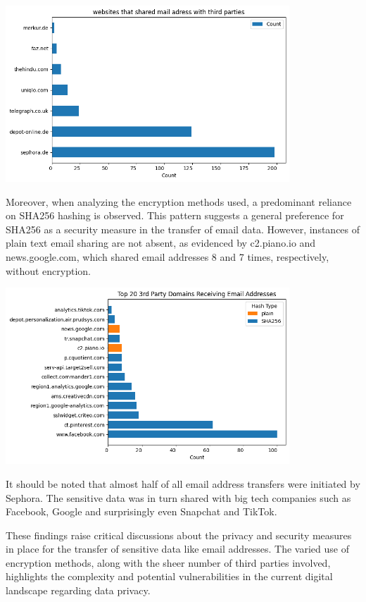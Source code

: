 \includegraphics[width=0.8\textwidth]{./assets/websitesSharingMailAddresses.png}

Moreover, when analyzing the encryption methods used, a predominant reliance on SHA256 hashing is observed. This pattern suggests a general preference for SHA256 as a security measure in the transfer of email data. However, instances of plain text email sharing are not absent, as evidenced by c2.piano.io and news.google.com, which shared email addresses 8 and 7 times, respectively, without encryption.

\includegraphics[width=0.8\textwidth]{./assets/top20thirdpartydomainsreceivingmailaddresses.png}

It should be noted that almost half of all email address transfers were initiated by Sephora. The sensitive data was in turn shared with big tech companies such as Facebook, Google and surprisingly even Snapchat and TikTok.

These findings raise critical discussions about the privacy and security measures in place for the transfer of sensitive data like email addresses. The varied use of encryption methods, along with the sheer number of third parties involved, highlights the complexity and potential vulnerabilities in the current digital landscape regarding data privacy.


